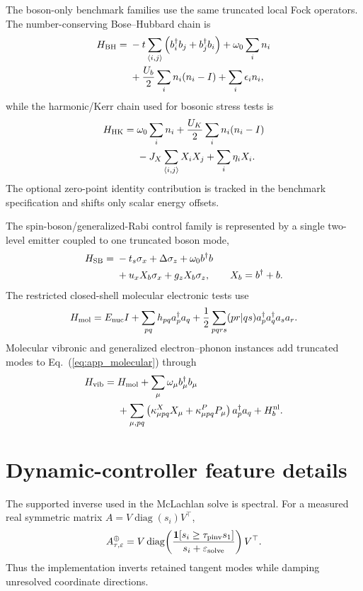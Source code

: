 \documentclass[
  reprint,
  amsmath,
  amssymb,
  aps,
  pra,
  nofootinbib,
  superscriptaddress,
  floatfix
]{revtex4-2}
\newcommand{\eps}{\varepsilon}
\begin{document}
The boson-only benchmark families use the same truncated local Fock operators. The number-conserving Bose--Hubbard chain is
\begin{align}
H_{\rm BH}={}&
-t\sum_{\langle i,j\rangle}
\left(b_i^\dagger b_j+b_j^\dagger b_i\right)
+\omega_0\sum_i n_i
\nonumber\\
&
+\frac{U_b}{2}\sum_i n_i(n_i-I)
+\sum_i\epsilon_i n_i ,
\label{eq:app_bose_hubbard}
\end{align}
while the harmonic/Kerr chain used for bosonic stress tests is
\begin{align}
H_{\rm HK}={}&
\omega_0\sum_i n_i
+\frac{U_K}{2}\sum_i n_i(n_i-I)
\nonumber\\
&
-J_X\sum_{\langle i,j\rangle}X_iX_j
+\sum_i\eta_iX_i .
\label{eq:app_harmonic_kerr}
\end{align}
The optional zero-point identity contribution is tracked in the benchmark specification and shifts only scalar energy offsets.

The spin-boson/generalized-Rabi control family is represented by a single two-level emitter coupled to one truncated boson mode,
\begin{align}
H_{\rm SB}={}&
-t_s\sigma_x+\Delta\sigma_z
+\omega_0 b^\dagger b
\nonumber\\
&
+u_xX_b\sigma_x
+g_zX_b\sigma_z,
\qquad X_b=b^\dagger+b .
\label{eq:app_spin_boson}
\end{align}
The restricted closed-shell molecular electronic tests use
\begin{equation}
H_{\rm mol}=E_{\rm nuc}I
+\sum_{pq}h_{pq}a_p^\dagger a_q
+\frac12\sum_{pqrs}(pr|qs)
a_p^\dagger a_q^\dagger a_s a_r .
\label{eq:app_molecular}
\end{equation}
Molecular vibronic and generalized electron--phonon instances add truncated modes to Eq.~(\ref{eq:app_molecular}) through
\begin{align}
H_{\rm vib}={}&H_{\rm mol}
+\sum_\mu\omega_\mu b_\mu^\dagger b_\mu
\nonumber\\
&
+\sum_{\mu,pq}
\left(\kappa^X_{\mu pq}X_\mu+\kappa^P_{\mu pq}P_\mu\right)
a_p^\dagger a_q
+H_b^{\rm nl}.
\label{eq:app_vibronic}
\end{align}

\section{Dynamic-controller feature details}
\label{app:dynamic_controller_details}

The supported inverse used in the McLachlan solve is spectral. For a measured real symmetric matrix $A=V\operatorname{diag}(s_i)V^\top$,
\begin{equation}
A_{\tau,\eps}^{\oplus}
=V\operatorname{diag}\!\left(
\frac{\mathbf 1[s_i\ge\tau_{\rm pinv}s_1]}{s_i+\eps_{\rm solve}}
\right)V^\top .
\label{eq:supported_inverse}
\end{equation}
Thus the implementation inverts retained tangent modes while damping unresolved coordinate directions.
\end{document}
